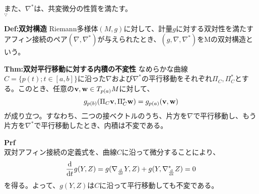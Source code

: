 \documentclass[a4paper,11pt]{jsarticle}
\numberwithin{equation}{section}
\begin{document}
また、$\nabla^*$は、共変微分の性質を満たす。\\
$\because$\\

\begin{itembox}[l]{\textbf{Def:双対構造}}
    Riemann多様体$(M,g)$に対して、計量$g$に対する双対性を満たすアフィン接続のペア$(\nabla,\nabla^*)$が与えられたとき、$(g,\nabla,\nabla^*)$をMの双対構造という。
\end{itembox}

\begin{itembox}[l]{\textbf{Thm:双対平行移動に対する内積の不変性}}
    なめらかな曲線$C = \{p(t) ; t \in [a,b]\}$に沿った$\nabla$および$\nabla^*$の平行移動をそれぞれ$\Pi_C,\Pi_C^*$とする。このとき、任意の$\vb{v},\vb{w} \in T_{p(a)}M$に対して、
    \begin{equation}
        g_{p(b)}(\Pi_C \vb{v},\Pi_C^* \vb{w}) = g_{p(a)}(\vb{v},\vb{w})
    \end{equation}
    が成り立つ。すなわち、二つの接ベクトルのうち、片方を$\nabla$で平行移動し、もう片方を$\nabla^*$で平行移動したとき、内積は不変である。

\end{itembox}
\textbf{Prf}\\
双対アフィン接続の定義式を、曲線$C$に沿って微分することにより、
\begin{equation}
    \dv{t}g(Y,Z) =g(\nabla_{\dv{t}}Y,Z) + g(Y,\nabla^*_{\dv{t}}Z)=0
\end{equation}
を得る。よって、$g(Y,Z)$は$C$に沿って平行移動しても不変である。\hfill\qedsymbol
\end{document}

